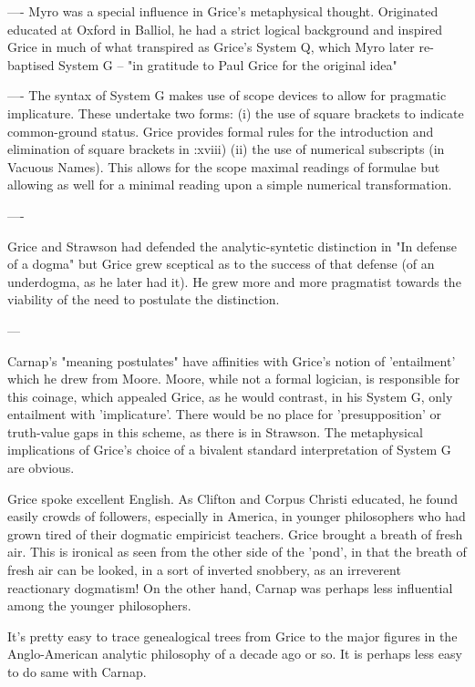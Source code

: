\documentclass[10pt,titlepage]{book}
\begin{document}
---- Myro was a special influence in Grice's metaphysical thought.  
Originated educated at Oxford in Balliol, he had a strict logical background and  
inspired Grice in much of what transpired as Grice's System Q, which Myro 
later  re-baptised System G -- "in gratitude to Paul Grice for the original 
idea"
 
---- The syntax of System G makes use of scope devices to allow for  
pragmatic implicature. These undertake two forms:
(i) the use of square brackets to indicate common-ground status. Grice  
provides formal rules for the introduction and elimination of square brackets 
in  \cite{grice89}:xviii)
(ii) the use of numerical subscripts (in Vacuous Names). This allows for  
the scope maximal readings of formulae but allowing as well for a minimal  
reading upon a simple numerical transformation. 
 
----
 
Grice and Strawson had defended the analytic-syntetic distinction in "In  
defense of a dogma" but Grice grew sceptical as to the success of that 
defense  (of an underdogma, as he later had it). He grew more and more pragmatist 
towards  the viability of the need to postulate the distinction.
 
---
 
Carnap's "meaning postulates" have affinities with Grice's notion of  
'entailment' which he drew from Moore. Moore, while not a formal logician, is  
responsible for this coinage, which appealed Grice, as he would contrast, in 
his  System G, only entailment with 'implicature'. There would be no place 
for  'presupposition' or truth-value gaps in this scheme, as there is in 
Strawson.  The metaphysical implications of Grice's choice of a bivalent standard 
 interpretation of System G are obvious.
 
Grice spoke excellent English. As Clifton and Corpus Christi educated, he  
found easily crowds of followers, especially in America, in younger 
philosophers  who had grown tired of their dogmatic empiricist teachers. Grice 
brought a  breath of fresh air. This is ironical as seen from the other side of 
the 'pond',  in that the breath of fresh air can be looked, in a sort of 
inverted snobbery,  as an irreverent reactionary dogmatism!  On the other hand, 
Carnap was  perhaps less influential among the younger philosophers. 
 
It's pretty easy to trace genealogical trees from Grice to the major  
figures in the Anglo-American analytic philosophy of a decade ago or so. It is  
perhaps less easy to do same with Carnap.
 
\end{document}
